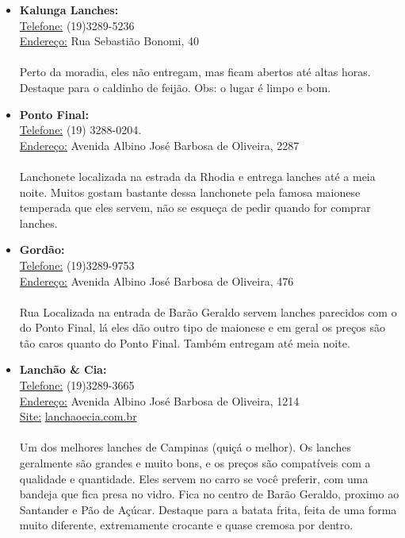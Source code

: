 \begin{itemize}
\item  \textbf{Kalunga Lanches:}
\\\underline{Telefone:} (19)3289-5236
\\\underline{Endereço:} Rua Sebastião Bonomi, 40
\\\\Perto da moradia, eles não entregam, mas ficam abertos até altas horas. Destaque para o caldinho de feijão. Obs: o lugar é limpo e bom.
\end{itemize}

\begin{itemize}
\item  \textbf{Ponto Final:}
\\\underline{Telefone:} (19) 3288-0204.
\\\underline{Endereço:} Avenida Albino José Barbosa de Oliveira, 2287
\\\\Lanchonete localizada na estrada da Rhodia e entrega lanches até a meia noite. Muitos gostam bastante dessa lanchonete pela famosa maionese temperada que eles servem, não se esqueça de pedir quando for comprar lanches.
\end{itemize}

\begin{itemize}
\item  \textbf{Gordão:}
\\\underline{Telefone:} (19)3289-9753
\\\underline{Endereço:} Avenida Albino José Barbosa de Oliveira, 476
\\\\Rua Localizada na entrada de Barão Geraldo servem lanches parecidos com o do Ponto Final, lá eles dão outro tipo de maionese e em geral os preços são tão caros quanto do Ponto Final. Também entregam até meia noite.
\end{itemize}

\begin{itemize}
\item  \textbf{Lanchão \& Cia:}
\\\underline{Telefone:} (19)3289-3665
\\\underline{Endereço:} Avenida Albino José Barbosa de Oliveira, 1214
\\\underline{Site:} \url{lanchaoecia.com.br}
\\\\Um dos melhores lanches de Campinas (quiçá o melhor). Os lanches geralmente são grandes e muito bons, e os preços são compatíveis com a qualidade e quantidade. Eles servem no carro se você preferir, com uma bandeja que fica presa no vidro. Fica no centro de Barão Geraldo, proximo ao Santander e Pão de Açúcar. Destaque para a batata frita, feita de uma forma muito diferente, extremamente crocante e quase cremosa por dentro.
\end{itemize}

